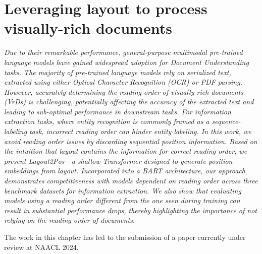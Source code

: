 
\chapter{Leveraging layout to process visually-rich documents}
\label{chapter:layout2pos}

\renewcommand{\leftmark}{\spacedlowsmallcaps{Leveraging layout to process visually-rich documents}}

\begin{chapabstract}
    {\em
    Due to their remarkable performance, general-purpose multimodal pre-trained language models have gained widespread adoption for Document Understanding tasks. The majority of pre-trained language models rely on serialized text, extracted using either Optical Character Recognition (OCR) or PDF parsing. However, accurately determining the reading order of visually-rich documents (VrDs) is challenging, potentially affecting the accuracy of the extracted text and leading to sub-optimal performance in downstream tasks. For information extraction tasks, where entity recognition is commonly framed as a sequence-labeling task, incorrect reading order can hinder entity labeling. In this work, we avoid reading order issues by discarding sequential position information. Based on the intuition that layout contains the information for correct reading order, we present Layout2Pos—a shallow Transformer designed to generate position embeddings from layout. Incorporated into a BART architecture, our approach demonstrates competitiveness with models dependent on reading order across three benchmark datasets for information extraction. We also show that evaluating models using a reading order different from the one seen during training can result in substantial performance drops, thereby highlighting the importance of not relying on the reading order of documents. \\
    \vspace*{5mm}

    The work in this chapter has led to the submission of a paper currently under review at NAACL 2024.}
\end{chapabstract}



\newpage

\minitoc
{}

